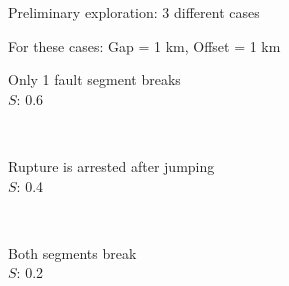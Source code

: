 \documentclass{beamer}
\begin{document}
\begin{frame}
 {Preliminary exploration: 3 different cases}

 \begin{center}
 For these cases: Gap = 1 km, Offset = 1 km \\
 \vskip 0.4cm
 \begin{minipage}{0.48\linewidth}
    \centering \small Only 1 fault segment breaks \\
  	$S$: 0.6
 \end{minipage} \,
 \begin{minipage}{0.48\linewidth}
    \centering \small Rupture is arrested after jumping \\
  	$S$: 0.4
 \end{minipage} \\
 \vskip 0.5cm
 \begin{minipage}{0.45\linewidth}
    \centering \small Both segments break \\
  	$S$: 0.2
 \end{minipage}
 \end{center}
 \addtocounter{framenumber}{-1}
  
\end{frame}
\end{document}
